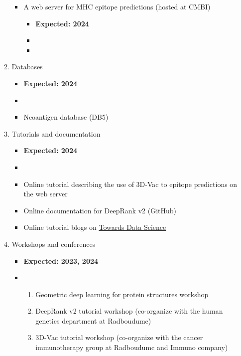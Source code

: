 \begin{itemize}[leftmargin=0.27in,label={\bfseries {}}]
\begin{enumerate}[start=1,leftmargin=.7in,label={\ding{226} D\arabic*.}]
\begin{itemize}
\begin{itemize}
            \end{itemize}
            \item A web server for MHC epitope predictions (hosted at CMBI)
            \begin{itemize}
                \item \textbf{Expected: 2024}
                \item {}
                \item {}
            \end{itemize}
        \end{itemize}
        \item Databases
        \begin{itemize}
            \item \textbf{Expected: 2024}
            \item {}
            \item Neoantigen database (DB5)
        \end{itemize}   
        \item Tutorials and documentation
        \begin{itemize}
            \item \textbf{Expected: 2024}
            \item {}
            \item Online tutorial describing the use of 3D-Vac to epitope predictions on the web server
            \item Online documentation for DeepRank v2 (GitHub)
            \item Online tutorial blogs on \href{https://towardsdatascience.com/}{Towards Data Science}
        \end{itemize}
        \item Workshops and conferences
        \begin{itemize}
            \item \textbf{Expected: 2023, 2024}
            \item {}
            \begin{enumerate}[label=\alph*.]
                \item Geometric deep learning for protein structures workshop
                \item DeepRank v2 tutorial workshop (co-organize with the human genetics department at Radboudumc)
                \item 3D-Vac tutorial workshop (co-organize with the cancer immunotherapy group at Radboudumc and Immuno company)
            \end{enumerate}
        \end{itemize}        
    \end{enumerate}
\end{itemize}



